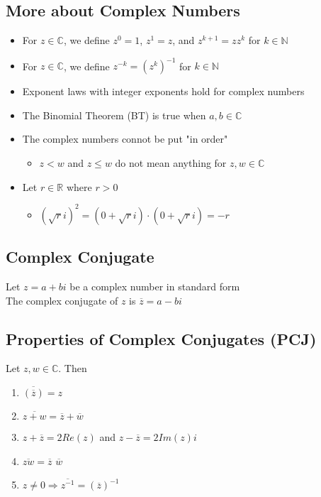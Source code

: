 \documentclass[12pt, letterpaper]{article}
\begin{document}
\subsection{More about Complex Numbers}
\begin{itemize}
    \item For $z \in \mathbb{C}$, we define $z^0 = 1$, $z^1 = z$, and $z^{k+1} = zz^k$ for $k \in \mathbb{N}$
    \item For $z \in \mathbb{C}$, we define $z^{-k} = (z^k)^{-1}$ for $k \in \mathbb{N}$
    \item Exponent laws with integer exponents hold for complex numbers
    \item The Binomial Theorem (BT) is true when $a, b \in \mathbb{C}$
    \item The complex numbers connot be put "in order"
    \begin{itemize}
        \item $z < w$ and $z \leq w$ do not mean anything for $z, w \in \mathbb{C}$
    \end{itemize}
    \item Let $r \in \mathbb{R}$ where $r > 0$
    \begin{itemize}
        \item $(\sqrt{r}i)^2 = (0 + \sqrt{r}i)\cdot(0 + \sqrt{r}i) = -r$ 
    \end{itemize}
\end{itemize}
\subsection{Complex Conjugate}
Let $z = a+bi$ be a complex number in standard form \\
The complex conjugate of $z$ is $\overline{z} = a-bi$
\subsection{Properties of Complex Conjugates (PCJ)}
Let $z,w \in \mathbb{C}$. Then 
\begin{enumerate}
    \item $\overline{(\overline{z})} = z$
    \item $\overline{z+w} = \overline{z} + \overline{w}$
    \item $z + \overline{z} = 2Re(z)$ and $z - \overline{z} = 2Im(z)i$
    \item $\overline{zw} = \overline{z}$ $\overline{w}$
    \item $z\neq 0 \Rightarrow {\overline{z^{-1}}} = (\overline{z})^{-1}$
\end{enumerate}
\end{document}

